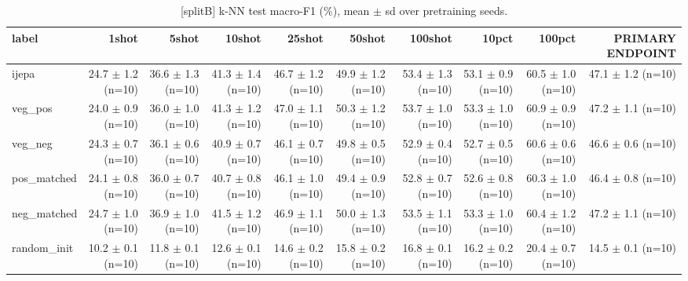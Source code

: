 \begin{table}[t]
\centering
\small
\caption{[splitB] k-NN test macro-F1 (\%), mean $\pm$ sd over pretraining seeds.}
\label{tab:main_results_knn}
\begin{tabular}{lrrrrrrrrr}
\toprule
label & 1shot & 5shot & 10shot & 25shot & 50shot & 100shot & 10pct & 100pct & PRIMARY ENDPOINT \\
\midrule
ijepa & 24.7 $\pm$ 1.2 (n=10) & 36.6 $\pm$ 1.3 (n=10) & 41.3 $\pm$ 1.4 (n=10) & 46.7 $\pm$ 1.2 (n=10) & 49.9 $\pm$ 1.2 (n=10) & 53.4 $\pm$ 1.3 (n=10) & 53.1 $\pm$ 0.9 (n=10) & 60.5 $\pm$ 1.0 (n=10) & 47.1 $\pm$ 1.2 (n=10) \\
veg\_pos & 24.0 $\pm$ 0.9 (n=10) & 36.0 $\pm$ 1.0 (n=10) & 41.3 $\pm$ 1.2 (n=10) & 47.0 $\pm$ 1.1 (n=10) & 50.3 $\pm$ 1.2 (n=10) & 53.7 $\pm$ 1.0 (n=10) & 53.3 $\pm$ 1.0 (n=10) & 60.9 $\pm$ 0.9 (n=10) & 47.2 $\pm$ 1.1 (n=10) \\
veg\_neg & 24.3 $\pm$ 0.7 (n=10) & 36.1 $\pm$ 0.6 (n=10) & 40.9 $\pm$ 0.7 (n=10) & 46.1 $\pm$ 0.7 (n=10) & 49.8 $\pm$ 0.5 (n=10) & 52.9 $\pm$ 0.4 (n=10) & 52.7 $\pm$ 0.5 (n=10) & 60.6 $\pm$ 0.6 (n=10) & 46.6 $\pm$ 0.6 (n=10) \\
pos\_matched & 24.1 $\pm$ 0.8 (n=10) & 36.0 $\pm$ 0.7 (n=10) & 40.7 $\pm$ 0.8 (n=10) & 46.1 $\pm$ 1.0 (n=10) & 49.4 $\pm$ 0.9 (n=10) & 52.8 $\pm$ 0.7 (n=10) & 52.6 $\pm$ 0.8 (n=10) & 60.3 $\pm$ 1.0 (n=10) & 46.4 $\pm$ 0.8 (n=10) \\
neg\_matched & 24.7 $\pm$ 1.0 (n=10) & 36.9 $\pm$ 1.0 (n=10) & 41.5 $\pm$ 1.2 (n=10) & 46.9 $\pm$ 1.1 (n=10) & 50.0 $\pm$ 1.3 (n=10) & 53.5 $\pm$ 1.1 (n=10) & 53.3 $\pm$ 1.0 (n=10) & 60.4 $\pm$ 1.2 (n=10) & 47.2 $\pm$ 1.1 (n=10) \\
random\_init & 10.2 $\pm$ 0.1 (n=10) & 11.8 $\pm$ 0.1 (n=10) & 12.6 $\pm$ 0.1 (n=10) & 14.6 $\pm$ 0.2 (n=10) & 15.8 $\pm$ 0.2 (n=10) & 16.8 $\pm$ 0.1 (n=10) & 16.2 $\pm$ 0.2 (n=10) & 20.4 $\pm$ 0.7 (n=10) & 14.5 $\pm$ 0.1 (n=10) \\
\bottomrule
\end{tabular}
\end{table}
